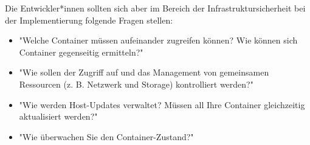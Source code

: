 Die Entwickler*innen sollten sich aber im Bereich der Infrastruktursicherheit bei der Implementierung folgende Fragen stellen:

\begin{itemize}
    \item "Welche Container müssen aufeinander zugreifen können? Wie können sich Container gegenseitig ermitteln?" \cite{ContainerSecurity}
    \item "Wie sollen der Zugriff auf und das Management von gemeinsamen Ressourcen (z. B. Netzwerk und Storage) kontrolliert werden?" \cite{ContainerSecurity}
    \item "Wie werden Host-Updates verwaltet? Müssen all Ihre Container gleichzeitig aktualisiert werden?" \cite{ContainerSecurity}
    \item "Wie überwachen Sie den Container-Zustand?" \cite{ContainerSecurity}
\end{itemize}
